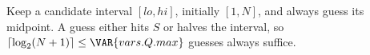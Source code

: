 Keep a candidate interval $[lo, hi]$, initially $[1, N]$, and always guess its
midpoint. A guess either hits $S$ or halves the interval, so
$\lceil \log_2 (N + 1) \rceil \leq \VAR{vars.Q.max}$ guesses always suffice.

